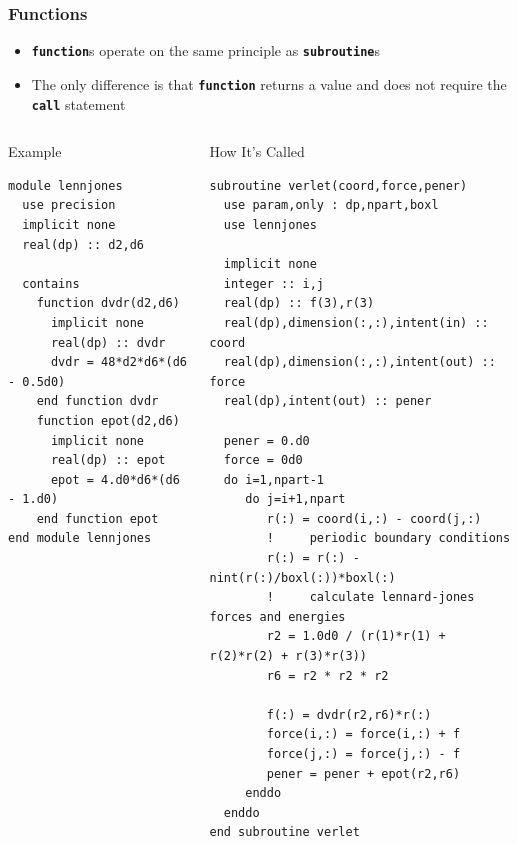 \documentclass[slidestop,mathserif,compress,xcolor=svgnames]{beamer}
\newenvironment{eblock}[0]
{
\begin{beamerboxesrounded}[upper=uppercol2,lower=lowercol2,shadow=true]}
{\end{beamerboxesrounded}}
\begin{document}
\begin{frame}[fragile]%
  \frametitle{\small Functions}
  \begin{block}{}
    \begin{itemize}
      \item \textbf{\texttt{function}}s operate on the same principle as \textbf{\texttt{subroutine}}s
      \item The only difference is that \textbf{\texttt{function}} returns a value and does not require the \textbf{\texttt{call}} statement 
    \end{itemize}
  \end{block}
  {\fontsize{4}{5}
    \begin{columns}
      \column{5.5cm}
      \begin{eblock}{Example}
        \begin{verbatim}
module lennjones
  use precision
  implicit none
  real(dp) :: d2,d6
  
  contains
    function dvdr(d2,d6) 
      implicit none
      real(dp) :: dvdr
      dvdr = 48*d2*d6*(d6 - 0.5d0)
    end function dvdr
    function epot(d2,d6)
      implicit none
      real(dp) :: epot
      epot = 4.d0*d6*(d6 - 1.d0)
    end function epot
end module lennjones
        \end{verbatim}
      \end{eblock}
      \column{5.5cm}
      \begin{eblock}{How It's Called}
        \begin{verbatim}
subroutine verlet(coord,force,pener)
  use param,only : dp,npart,boxl
  use lennjones

  implicit none
  integer :: i,j
  real(dp) :: f(3),r(3)
  real(dp),dimension(:,:),intent(in) :: coord
  real(dp),dimension(:,:),intent(out) :: force
  real(dp),intent(out) :: pener
  
  pener = 0.d0
  force = 0d0
  do i=1,npart-1
     do j=i+1,npart
        r(:) = coord(i,:) - coord(j,:)
        !     periodic boundary conditions
        r(:) = r(:) - nint(r(:)/boxl(:))*boxl(:)
        !     calculate lennard-jones forces and energies
        r2 = 1.0d0 / (r(1)*r(1) + r(2)*r(2) + r(3)*r(3))
        r6 = r2 * r2 * r2

        f(:) = dvdr(r2,r6)*r(:)
        force(i,:) = force(i,:) + f
        force(j,:) = force(j,:) - f
        pener = pener + epot(r2,r6)
     enddo
  enddo
end subroutine verlet
        \end{verbatim}
      \end{eblock}
    \end{columns}
  }
\end{frame}
\end{document}
